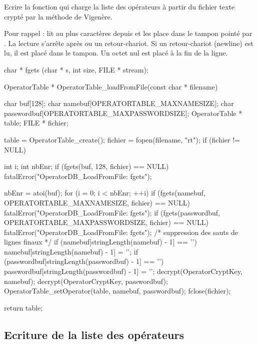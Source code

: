 Ecrire la fonction  qui charge la liste des opérateurs à partir du fichier texte crypté par la méthode de Vigenère.

Pour rappel :  lit au plus  caractères depuis  et les place dans le tampon pointé par .  La lecture s'arrête après  ou un retour-chariot. Si un retour-chariot (newline) est  lu,  il est placé dans le tampon. Un octet nul \ccode{\0} est placé à  la fin de la ligne.
\begin{csource}
char * fgets (char * s, int size, FILE * stream);
\end{csource}

\begin{csourcecorrection}
OperatorTable * OperatorTable_loadFromFile(const char * filename) {
    char buf[128];
    char namebuf[OPERATORTABLE_MAXNAMESIZE];
    char passwordbuf[OPERATORTABLE_MAXPASSWORDSIZE];
    OperatorTable * table;
    FILE * fichier;

    table = OperatorTable_create();
    fichier = fopen(filename, "rt");
    if (fichier != NULL) {
        int i;
        int nbEnr;
        if (fgets(buf, 128, fichier) == NULL)
            fatalError("OperatorDB_LoadFromFile: fgets");

        nbEnr = atoi(buf);
        for (i = 0; i < nbEnr; ++i) {
            if (fgets(namebuf, OPERATORTABLE_MAXNAMESIZE, fichier) == NULL)
                fatalError("OperatorDB_LoadFromFile: fgets");
            if (fgets(passwordbuf, OPERATORTABLE_MAXPASSWORDSIZE, fichier) == NULL)
                fatalError("OperatorDB_LoadFromFile: fgets");
            /* suppression des sauts de lignes finaux */
            if (namebuf[stringLength(namebuf) - 1] == '\n')
                namebuf[stringLength(namebuf) - 1] = '\0';
            if (passwordbuf[stringLength(passwordbuf) - 1] == '\n')
                passwordbuf[stringLength(passwordbuf) - 1] = '\0';
            decrypt(OperatorCryptKey, namebuf);
            decrypt(OperatorCryptKey, passwordbuf);
            OperatorTable_setOperator(table, namebuf, passwordbuf);
        }
        fclose(fichier);
    }
    return table;
}
\end{csourcecorrection}

\subsection{Ecriture de la liste des opérateurs}

